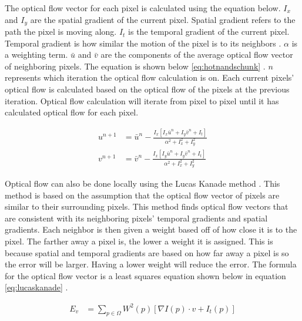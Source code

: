 \documentclass{article}
\begin{document}
    The optical flow vector for each pixel is calculated using the equation below. $I_x$  and $I_y$  are the spatial gradient of the current pixel. Spatial gradient refers to the path the pixel is moving along. $I_t$ is the temporal gradient of the current pixel. Temporal gradient is how similar the motion of the pixel is to its neighbors \cite{sun_optical_2008}. $\alpha$ is a weighting term. $\bar{u}$ and $\bar{v}$ are the components of the average optical flow vector of neighboring pixels. The equation is shown below \ref{eq:hotnandschunk} \cite{odonovan_optical_2005}. $n$ represents which iteration the optical flow calculation is on. Each current pixels' optical flow is calculated based on the optical flow of the pixels at the previous iteration. Optical flow calculation will iterate from pixel to pixel until it has calculated optical flow for each pixel.

    \begin{equation} \label{eq:hotnandschunk}
      \begin{split}
        u^{n+1} &= \bar{u}^n-\frac{I_x[I_x\bar{u}^n+I_y\bar{v}^n+I_t]}{\alpha^2+I_x^2+I_y^2} \\
        v^{n+1} &= \bar{v}^n-\frac{I_x[I_y\bar{u}^n+I_y\bar{v}^n+I_t]}{\alpha^2+I_x^2+I_y^2}
      \end{split}
    \end{equation}

    Optical flow can also be done locally using the Lucas Kanade method \cite{sun_optical_2008}. This method is based on the assumption that the optical flow vector of pixels are similar to their surrounding pixels. This method finds optical flow vectors that are consistent with its neighboring pixels' temporal gradients and spatial gradients. Each neighbor is then given a weight based off of how close it is to the pixel. The farther away a pixel is, the lower a weight it is assigned. This is because spatial and temporal gradients are based on how far away a pixel is so the error will be larger. Having a lower weight will reduce the error. The formula for the optical flow vector is a least squares equation shown below in equation \ref{eq:lucaskanade} \cite{odonovan_optical_2005}.

    \begin{equation} \label{eq:lucaskanade}
      \begin{split}
        E_v &= \sum_{p\in\Omega}W^2(p)[\nabla I(p)\cdot v + I_t(p)] \\
      \end{split}
    \end{equation}
\end{document}
